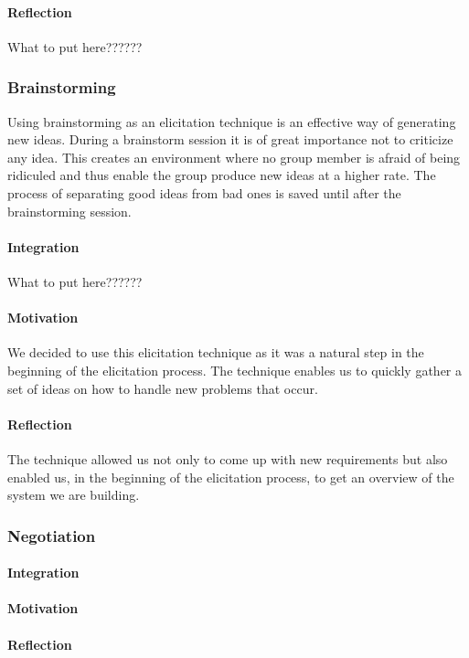 \documentclass[10pt]{article}
\begin{document}
\paragraph{Reflection}
What to put here??????

\subsubsection{Brainstorming}
Using brainstorming as an elicitation technique is an effective way of generating new ideas. During a brainstorm session it is of great importance not to criticize any idea. This creates an environment where no group member is afraid of being ridiculed and thus enable the group produce new ideas at a higher rate.
The process of separating good ideas from bad ones is saved until after the brainstorming session. 
\paragraph{Integration}
What to put here??????
\paragraph{Motivation}
We decided to use this elicitation technique as it was a natural step in the beginning of the elicitation process. The technique enables us to quickly gather a set of ideas on how to handle new problems that occur.
\paragraph{Reflection}
The technique allowed us not only to come up with new requirements but also enabled us, in the beginning of the elicitation process, to get an overview of the system we are building.


\subsubsection{Negotiation}
\paragraph{Integration}
\paragraph{Motivation}
\paragraph{Reflection}
\end{document}
